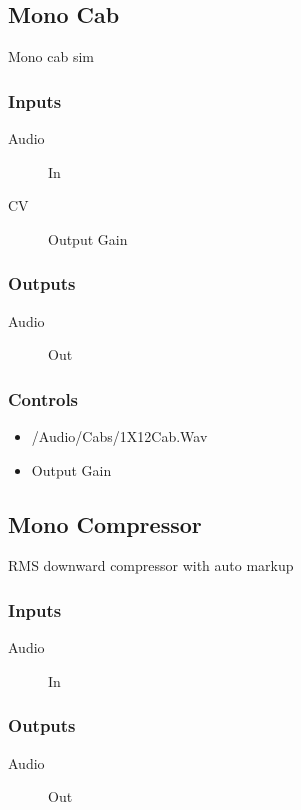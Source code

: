 \subsection{Mono Cab}

Mono cab sim



\subsubsection{Inputs}
\begin{description}
\item [Audio] In
\item [CV] Output Gain
\end{description}

\subsubsection{Outputs}
\begin{description}
\item [Audio] Out
\end{description}

\subsubsection{Controls}
\begin{itemize}
\item /Audio/Cabs/1X12Cab.Wav
\item Output Gain
\end{itemize}

\subsection{Mono Compressor}

RMS downward compressor with auto markup



\subsubsection{Inputs}
\begin{description}
\item [Audio] In
\end{description}

\subsubsection{Outputs}
\begin{description}
\item [Audio] Out
\end{description}

